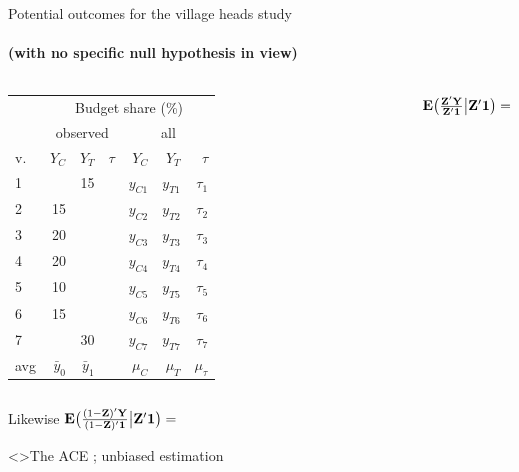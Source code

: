 \begin{frame}[t]{Potential outcomes for the village heads study}
\framesubtitle{(with no specific null hypothesis in view)}
  
\begin{columns}
\begin{tabular}{l|rrr|rrr} \hline
& \multicolumn{6}{c}{Budget share (\%)} \\
& \multicolumn{3}{c}{observed} & \multicolumn{3}{c}{all} \\
v. &$Y_{C}$& $Y_{T}$& $\tau$  &$Y_{C}$& $Y_{T}$& $\tau$ \\ \hline
1&     &15 &     & $y_{C1}$ & $y_{T1}$  & $\tau_{1}$\\
2& 15 &   &      & $y_{C2}$ & $y_{T2}$ & $\tau_{2}$\\ 
3& 20 &   &      & $y_{C3}$ & $y_{T3}$ & $\tau_{3}$\\
4& 20 &   &      & $y_{C4}$ & $y_{T4}$ & $\tau_{4}$\\
5& 10 &   &      & $y_{C5}$ & $y_{T5}$ & $\tau_{5}$\\
6& 15 &   &      & $y_{C6}$ & $y_{T6}$ & $\tau_{6}$\\
7&     & 30&     & $y_{C7}$ &$y_{T7}$ & $\tau_{7}$ \\ \hline
avg & $\bar{y}_{0} $ & $\bar{y}_{1}$ &  & $\mu_{C} $ & $\mu_{T}$ & $\mu_{\tau}$ \\ \hline
\end{tabular}
    
$\mathbf{E} \big( \frac{\mathbf{Z}'\mathbf{Y}}{\mathbf{Z}'\mathbf{1}}\big|  \mathbf{Z}'\mathbf{1} \big) =$\\[.5\textheight] 

\mbox{ }
\end{columns}
\vfill

Likewise $\mathbf{E} \big(
\frac{(1-\mathbf{Z})'\mathbf{Y}}{ (1-\mathbf{Z})'\mathbf{1}}\big|
\mathbf{Z}'\mathbf{1} \big) =$ \hfill 
\hfill \mbox{} \\
\end{frame}



\begin{frame}<\nottheirhandout>{The ACE ; unbiased estimation}
  \begin{center}
  \end{center}
\end{frame}


